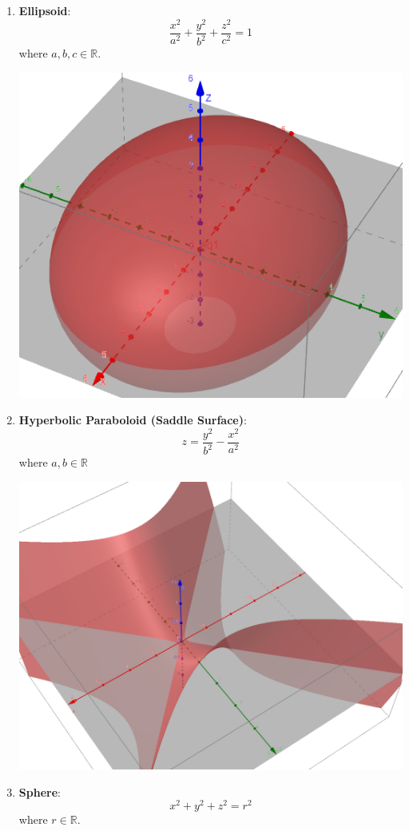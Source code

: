 \documentclass[12pt]{article}
\begin{document}
\begin{enumerate}
\item \textbf{Ellipsoid}: $$\frac{x^2}{a^2}+\frac{y^2}{b^2}+\frac{z^2}{c^2}=1$$ where $a,b,c \in \mathbb{R}$.

\newpage
\includegraphics[scale=0.7]{ellipsoid.png}

\item \textbf{Hyperbolic Paraboloid (Saddle Surface)}: $$z=\frac{y^2}{b^2}-\frac{x^2}{a^2}$$ where $a,b\in \mathbb{R}$

\includegraphics[scale=0.4]{saddle.png}

\item \textbf{Sphere}: $$x^2+y^2+z^2=r^2$$ where $r\in \mathbb{R}$.


\end{enumerate}
\end{document}

